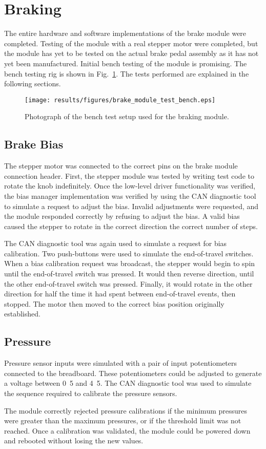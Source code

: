 \section{Braking}

The entire hardware and software implementations of the brake module were completed. Testing of the module with a real stepper motor were completed, but the module has yet to be tested on the actual brake pedal assembly as it has not yet been manufactured. Initial bench testing of the module is promising. The bench testing rig is shown in Fig.\ \ref{fig:brake_module_bench_test}. The tests performed are explained in the following sections.

\begin{figure}[H]
 \centering
 \texttt{[image: results/figures/brake\_module\_test\_bench.eps]}
 \caption{Photograph of the bench test setup used for the braking module.}
 \label{fig:brake_module_bench_test}
\end{figure}

\subsection{Brake Bias}

The stepper motor was connected to the correct pins on the brake module connection header. First, the stepper module was tested by writing test code to rotate the knob indefinitely. Once the low-level driver functionality was verified, the bias manager implementation was verified by using the CAN diagnostic tool to simulate a request to adjust the bias. Invalid adjustments were requested, and the module responded correctly by refusing to adjust the bias. A valid bias caused the stepper to rotate in the correct direction the correct number of steps.

The CAN diagnostic tool was again used to simulate a request for bias calibration. Two push-buttons were used to simulate the end-of-travel switches. When a bias calibration request was broadcast, the stepper would begin to spin until the end-of-travel switch was pressed. It would then reverse direction, until the other end-of-travel switch was pressed. Finally, it would rotate in the other direction for half the time it had spent between end-of-travel events, then stopped. The motor then moved to the correct bias position originally established.

\subsection{Pressure}

Pressure sensor inputs were simulated with a pair of input potentiometers connected to the breadboard. These potentiometers could be adjusted to generate a voltage between \unit{0.5}{\volt} and \unit{4.5}{\volt}. The CAN diagnostic tool was used to simulate the sequence required to calibrate the pressure sensors.

The module correctly rejected pressure calibrations if the minimum pressures were greater than the maximum pressures, or if the threshold limit was not reached. Once a calibration was validated, the module could be powered down and rebooted without losing the new values.

